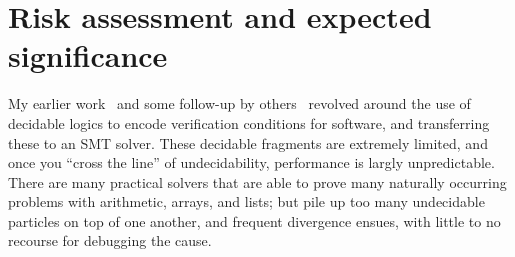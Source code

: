 \section{Risk assessment and expected significance}

My earlier work~\cite{phd} and some follow-up by others~\cite{padon,feldman} revolved around the use of decidable logics to encode verification conditions for software,
and transferring these to an SMT solver.
These decidable fragments are extremely limited, and once you ``cross the line'' of undecidability, performance is largly unpredictable.
There are many practical solvers that are able to prove many naturally occurring problems with arithmetic, arrays, and lists;
but pile up too many undecidable particles on top of one another, and frequent divergence ensues, with little to no recourse for debugging the cause.

